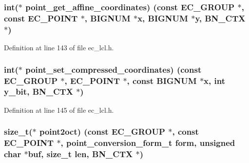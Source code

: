 \subsubsection[{\texorpdfstring{point\+\_\+get\+\_\+affine\+\_\+coordinates}{point_get_affine_coordinates}}]{\setlength{\rightskip}{0pt plus 5cm}int($\ast$ point\+\_\+get\+\_\+affine\+\_\+coordinates) (const {\bf E\+C\+\_\+\+G\+R\+O\+UP} $\ast$, const {\bf E\+C\+\_\+\+P\+O\+I\+NT} $\ast$, {\bf B\+I\+G\+N\+UM} $\ast${\bf x}, {\bf B\+I\+G\+N\+UM} $\ast$y, {\bf B\+N\+\_\+\+C\+TX} $\ast$)}\hypertarget{structec__method__st_a825c824817a97f7c9e5c5a6765eeb9c0}{}\label{structec__method__st_a825c824817a97f7c9e5c5a6765eeb9c0}


Definition at line 143 of file ec\+\_\+lcl.\+h.

\subsubsection[{\texorpdfstring{point\+\_\+set\+\_\+compressed\+\_\+coordinates}{point_set_compressed_coordinates}}]{\setlength{\rightskip}{0pt plus 5cm}int($\ast$ point\+\_\+set\+\_\+compressed\+\_\+coordinates) (const {\bf E\+C\+\_\+\+G\+R\+O\+UP} $\ast$, {\bf E\+C\+\_\+\+P\+O\+I\+NT} $\ast$, const {\bf B\+I\+G\+N\+UM} $\ast${\bf x}, int y\+\_\+bit, {\bf B\+N\+\_\+\+C\+TX} $\ast$)}\hypertarget{structec__method__st_aab50fd3afc5214c5af8b3451bfbd8827}{}\label{structec__method__st_aab50fd3afc5214c5af8b3451bfbd8827}


Definition at line 145 of file ec\+\_\+lcl.\+h.

\subsubsection[{\texorpdfstring{point2oct}{point2oct}}]{\setlength{\rightskip}{0pt plus 5cm}size\+\_\+t($\ast$ point2oct) (const {\bf E\+C\+\_\+\+G\+R\+O\+UP} $\ast$, const {\bf E\+C\+\_\+\+P\+O\+I\+NT} $\ast$, {\bf point\+\_\+conversion\+\_\+form\+\_\+t} {\bf form}, unsigned char $\ast$buf, size\+\_\+t {\bf len}, {\bf B\+N\+\_\+\+C\+TX} $\ast$)}\hypertarget{structec__method__st_a3c1c4799ceffa00d247e50698da48d56}{}\label{structec__method__st_a3c1c4799ceffa00d247e50698da48d56}


